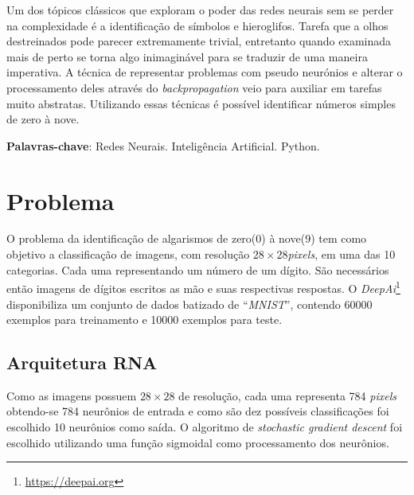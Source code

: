 \documentclass[
	article,			%
	11pt,				%
	oneside,			%
	a4paper,			%
	openany,
	english,			%
	brazil,				%
	sumario=tradicional
	]{abntex2}
\begin{document}
\frenchspacing
\maketitle

\begin{resumoumacoluna}
	Um dos tópicos clássicos que exploram o poder das redes neurais
	sem se perder na complexidade é a identificação de símbolos e
	hieroglifos. Tarefa que a olhos destreinados pode parecer
	extremamente trivial, entretanto quando examinada mais de
	perto se torna algo inimaginável para se traduzir de uma
	maneira imperativa. A técnica de representar problemas
	com pseudo neurónios e alterar o processamento deles através
	do \emph{backpropagation} veio para auxiliar em tarefas muito
	abstratas. Utilizando essas técnicas é possível identificar
	números simples de zero à nove.

	\vspace{\onelineskip}
	\noindent
	\textbf{Palavras-chave}: Redes Neurais. Inteligência Artificial. Python.
\end{resumoumacoluna}


\textual

\section{Problema}
O problema da identificação de algarismos de zero(0) à nove(9)
tem como objetivo a classificação de imagens, com resolução
\(28\times28\)\emph{pixels}, em uma das 10 categorias. Cada
uma representando um número de um dígito. São necessários então
imagens de dígitos escritos as mão e suas respectivas respostas.
O \emph{DeepAi}\footnote{\url{https://deepai.org}}
disponibiliza um conjunto de dados batizado de ``\emph{MNIST}'',
contendo 60000 exemplos para treinamento e 10000 exemplos para
teste.

\subsection{Arquitetura RNA}
Como as imagens possuem \(28\times28\) de resolução, cada uma
representa 784 \emph{pixels} obtendo-se 784 neurônios de entrada
e como são dez possíveis classificações foi escolhido 10 neurônios
como saída. O algoritmo de \emph{stochastic gradient descent} foi
escolhido utilizando uma função sigmoidal como processamento dos
neurônios.
\end{document}
